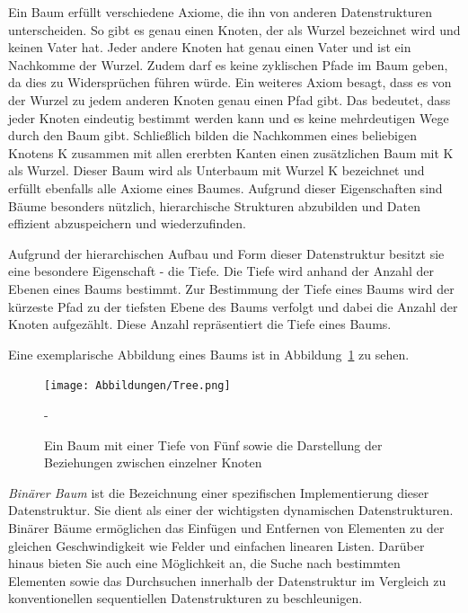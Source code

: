 Ein Baum erfüllt verschiedene Axiome, die ihn von anderen Datenstrukturen unterscheiden. So gibt es genau einen Knoten, der als Wurzel bezeichnet wird und keinen Vater hat. Jeder andere Knoten hat genau einen Vater und ist ein Nachkomme der Wurzel. Zudem darf es keine zyklischen Pfade im Baum geben, da dies zu Widersprüchen führen würde. Ein weiteres Axiom besagt, dass es von der Wurzel zu jedem anderen Knoten genau einen Pfad gibt. Das bedeutet, dass jeder Knoten eindeutig bestimmt werden kann und es keine mehrdeutigen Wege durch den Baum gibt. Schließlich bilden die Nachkommen eines beliebigen Knotens K zusammen mit allen ererbten Kanten einen zusätzlichen Baum mit K als Wurzel. Dieser Baum wird als Unterbaum mit Wurzel K bezeichnet und erfüllt ebenfalls alle Axiome eines Baumes. Aufgrund dieser Eigenschaften sind Bäume besonders nützlich, hierarchische Strukturen abzubilden und Daten effizient abzuspeichern und wiederzufinden. \autocite[389]{gumm_band_2016}

Aufgrund der hierarchischen Aufbau und Form dieser Datenstruktur besitzt sie eine besondere Eigenschaft - die Tiefe. Die Tiefe wird anhand der Anzahl der Ebenen eines Baums bestimmt. Zur Bestimmung der Tiefe eines Baums wird der kürzeste Pfad zu der tiefsten Ebene des Baums verfolgt und dabei die Anzahl der Knoten aufgezählt. Diese Anzahl repräsentiert die Tiefe eines Baums. \autocite[390]{gumm_band_2016}

Eine exemplarische Abbildung eines Baums ist in Abbildung~\ref{fig: tree} zu sehen.

\begin{figure}[t]
	\texttt{[image: Abbildungen/Tree.png]}
	\centering
	\caption[Binärbaum]{Ein Baum mit einer Tiefe von Fünf sowie die Darstellung der Beziehungen zwischen einzelner Knoten \autocite[390]{gumm_band_2016}}-
	\label{fig: tree}
\end{figure}

\textit{Binärer Baum} ist die Bezeichnung einer spezifischen Implementierung dieser Datenstruktur. Sie dient als einer der wichtigsten dynamischen Datenstrukturen. Binärer Bäume ermöglichen das Einfügen und Entfernen von Elementen zu der gleichen Geschwindigkeit wie Felder und einfachen linearen Listen. Darüber hinaus bieten Sie auch eine Möglichkeit an, die Suche nach bestimmten Elementen sowie das Durchsuchen innerhalb der Datenstruktur im Vergleich zu konventionellen sequentiellen Datenstrukturen zu beschleunigen. \autocite[617]{ernst_grundkurs_2020}


